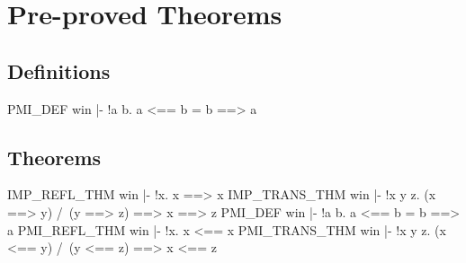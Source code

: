 \chapter{Pre-proved Theorems}

\section{Definitions}
\THEOREM PMI\_DEF win
|- !a b. a <== b = b ==> a
\ENDTHEOREM
\section{Theorems}
\THEOREM IMP\_REFL\_THM win
|- !x. x ==> x
\ENDTHEOREM
\THEOREM IMP\_TRANS\_THM win
|- !x y z. (x ==> y) /\ (y ==> z) ==> x ==> z
\ENDTHEOREM
\THEOREM PMI\_DEF win
|- !a b. a <== b = b ==> a
\ENDTHEOREM
\THEOREM PMI\_REFL\_THM win
|- !x. x <== x
\ENDTHEOREM
\THEOREM PMI\_TRANS\_THM win
|- !x y z. (x <== y) /\ (y <== z) ==> x <== z
\ENDTHEOREM
